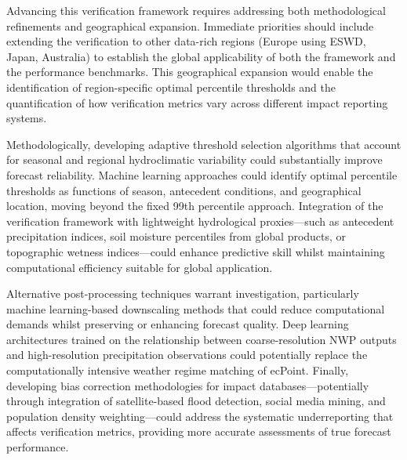 Advancing this verification framework requires addressing both methodological refinements and geographical expansion. Immediate priorities should include extending the verification to other data-rich regions (Europe using ESWD, Japan, Australia) to establish the global applicability of both the framework and the performance benchmarks. This geographical expansion would enable the identification of region-specific optimal percentile thresholds and the quantification of how verification metrics vary across different impact reporting systems.

Methodologically, developing adaptive threshold selection algorithms that account for seasonal and regional hydroclimatic variability could substantially improve forecast reliability. Machine learning approaches could identify optimal percentile thresholds as functions of season, antecedent conditions, and geographical location, moving beyond the fixed 99th percentile approach. Integration of the verification framework with lightweight hydrological proxies—such as antecedent precipitation indices, soil moisture percentiles from global products, or topographic wetness indices—could enhance predictive skill whilst maintaining computational efficiency suitable for global application.

Alternative post-processing techniques warrant investigation, particularly machine learning-based downscaling methods that could reduce computational demands whilst preserving or enhancing forecast quality. Deep learning architectures trained on the relationship between coarse-resolution NWP outputs and high-resolution precipitation observations could potentially replace the computationally intensive weather regime matching of ecPoint. Finally, developing bias correction methodologies for impact databases—potentially through integration of satellite-based flood detection, social media mining, and population density weighting—could address the systematic underreporting that affects verification metrics, providing more accurate assessments of true forecast performance.

